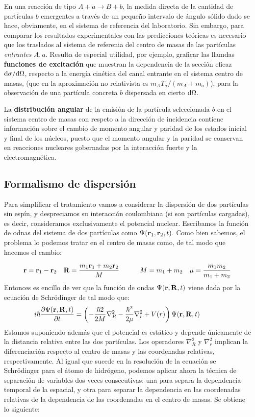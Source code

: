 En una reacción de tipo $A+a\longrightarrow B+b$, la medida directa de la cantidad de partículas $b$ emergentes a través de un pequeño intervalo de ángulo sólido dado se hace, obviamente, en el sistema de referencia del laboratorio. Sin  embargo, para comparar los resultados experimentales con las predicciones teóricas es necesario que los traslados al sistema de referenia del centro de masas de las partículas \textit{entrantes} $A,a$. Resulta de especial utilidad, por ejemplo, graficar las llamdas \textbf{funciones de excitación} que muestran la dependencia de la sección eficaz $\mathrm{d} \sigma / \mathrm{d} \Omega$, respecto a la energía cinética del canal entrante en el sistema centro de masas, (que en la aproximación no relativista es $m_A T_a / (m_A + m_a)$), para la observación de una partícula concreta $b$ dispersada en cierto $\mathrm{d} \Omega$. 

La \textbf{distribución angular} de la emisión de la partícula seleccionada $b$ en el sistema centro de masas con respeto a la dirección de incidencia contiene información sobre el cambio de momento angular y paridad de los estados inicial y final de los núcleos, puesto que el momento angular y la paridad se conservan en reacciones nucleares gobernadas por la interacción fuerte y la electromagnética.

\subsection{Formalismo de dispersión}

Para simplificar el tratamiento vamos a considerar la dispersión de dos partículas sin espín, y despreciamos su interacción coulombiana (si son partículas cargadas), es decir, consideramos exclusivamente el potencial nuclear. Escribamos la función de odnas del sistema de dos partículas como $\Psi (\mathbf{r}_1,\mathbf{r}_2,t)$. Como bien sabemos, el problema lo podemos tratar en el centro de masas como, de tal modo que hacemos el cambio:

\begin{equation}
	\mathbf{r} = \mathbf{r}_1 - \mathbf{r}_2 \quad \mathbf{R} = \frac{m_1 \mathbf{r}_1 + m_2 \mathbf{r}_2}{M} \quad \quad \quad M = m_1 + m_2 \quad \mu = \frac{m_1 m_2}{m_1 + m_2}
\end{equation}
Entonces es encillo de ver que la función de ondas $\Psi(\mathbf{r},\mathbf{R},t)$ viene dada por la ecuación de Schrödinger de tal modo que:
\begin{equation}
	i \hbar \frac{\partial \Psi (\mathbf{r},\mathbf{R},t)}{\partial t} = \left( -\frac{\hbar2}{2M} \nabla_R^2-\frac{\hbar^2}{2\mu} \nabla_r^2 + V(r) \right) \Psi(\mathbf{r},\mathbf{R},t) \quad \quad \quad 
\end{equation}
Estamos suponiendo además que el potencial es estático y depende únicamente de la distancia relativa entre las dos partículas. Los operadores $\nabla_R^2$ y $\nabla_r^2$ implican la diferenciación respecto al centro de masas y las coordenadas relativas, respectivamente. Al igual que sucede en la resolución de la ecuación se Schrödinger para el átomo de hidrógeno, podemos aplicar ahora la técnica de separación de variables dos veces consecutivas: una para separa la dependencia temporal de la espacial, y otra para separar la dependencia en las coordenadas relativas de la dependencia de las coordenadas en el centro de masas. Se obtiene lo siguiente: 

